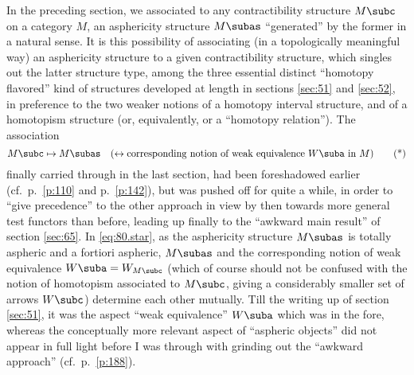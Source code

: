\label{sec:80}%
In the preceding section, we associated to any contractibility
structure $M\subc$ on a category $M$, an asphericity structure
$M\subas$ ``generated'' by the former in a natural sense. It is this
possibility of associating (in a topologically meaningful way) an
asphericity structure to a given contractibility structure, which
singles out the latter structure type, among the three essential
distinct ``homotopy flavored'' kind of structures developed at length
in sections \ref{sec:51} and \ref{sec:52}, in preference to the two
weaker notions of a homotopy interval structure, and of a homotopism
structure (or, equivalently, or a ``homotopy relation''). The
association
\begin{equation}
  \label{eq:80.star}
  M\subc\mapsto M\subas \quad(\leftrightarrow \text{corresponding
    notion of weak equivalence $W\suba$ in $M$})
  \tag{*}
\end{equation}
finally carried through in the last section, had been foreshadowed
earlier (cf.\ p.\ \ref{p:110} and p.\ \ref{p:142}), but was pushed off
for quite a while, in order to ``give precedence'' to the other
approach in view by then towards more general test functors than
before, leading up finally to the ``awkward main result'' of section
\ref{sec:65}. In \eqref{eq:80.star}, as the asphericity structure
$M\subas$ is totally aspheric and a fortiori aspheric, $M\subas$ and
the corresponding notion of weak equivalence $W\suba=W_{M\subc}$ (which
of course should not be confused with the notion of homotopism
associated to $M\subc$, giving a considerably smaller set of arrows
$W\subc$) determine each other mutually. Till the writing up of
section \ref{sec:51}, it was the aspect ``weak equivalence'' $W\suba$
which was in the fore, whereas the conceptually more relevant aspect
of ``aspheric objects'' did not appear in full light before I was
through with grinding out the ``awkward approach'' (cf.\ p.\
\ref{p:188}).

